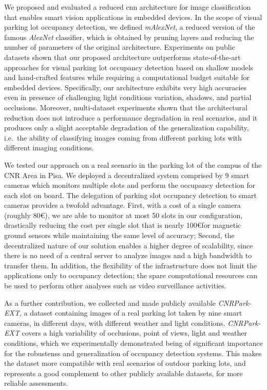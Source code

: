 We proposed and evaluated a reduced \acrlong{cnn} architecture for image classification that enables smart vision applications in embedded devices.
In the scope of visual parking lot occupancy detection, we defined \emph{mAlexNet}, a reduced version of the famous \emph{AlexNet} classifier, which is obtained by pruning layers and reducing the number of parameters of the original architecture.
Experiments on public datasets shown that our proposed architecture outperforms state-of-the-art approaches for visual parking lot occupancy detection based on shallow models and hand-crafted features while requiring a computational budget suitable for embedded devices.
Specifically, our architecture exhibits very high accuracies even in presence of challenging light conditions variation, shadows, and partial occlusions.
Moreover, multi-dataset experiments shown that the architectural reduction does not introduce a performance degradation in real scenarios, and it produces only a slight acceptable degradation of the generalization capability, i.e.\ the ability of classifying images coming from different parking lots with different imaging conditions.

We tested our approach on a real scenario in the parking lot of the campus of the CNR Area in Pisa.
We deployed a decentralized system comprised by 9 smart cameras which monitors multiple slots and perform the occupancy detection for each slot on board.
The delegation of parking slot occupancy detection to smart cameras provides a twofold advantage.
First, with a cost of a single camera (roughly 80\euro), we are able to monitor at most 50 slots in our configuration, drastically reducing the cost per single slot that is nearly 100\euro for magnetic ground sensors while maintaining the same level of accuracy;
Second, the decentralized nature of our solution enables a higher degree of scalability, since there is no need of a central server to analyze images and a high bandwidth to transfer them.
In addition, the flexibility of the infrastructure does not limit the applications only to occupancy detection;
the spare computational resources can be used to perform other analyses such as video surveillance activities.

As a further contribution, we collected and made publicly available \emph{CNRPark-EXT}, a dataset containing images of a real parking lot taken by nine smart cameras, in different days, with different weather and light conditions.
\emph{CNRPark-EXT} covers a high variability of occlusions, point of views, light and weather conditions, which we experimentally demonstrated being of significant importance for the robustenss and generalization of occupancy detection systems.
This makes the dataset more compatible with real scenarios of outdoor parking lots, and represents a good complement to other publicly available datasets, for more reliable assessments.

